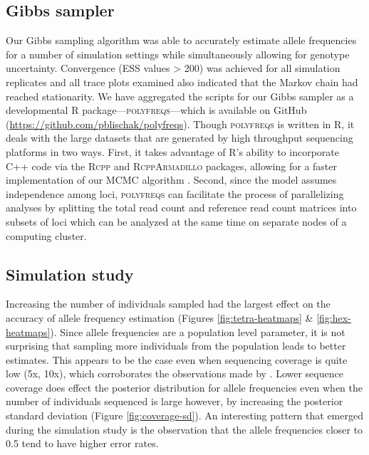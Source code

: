 \documentclass[11pt,english,letterpaper,oneside]{article}
\begin{document}
\subsection*{Gibbs sampler}
\medskip

Our Gibbs sampling algorithm was able to accurately estimate allele frequencies for a number of simulation settings while simultaneously allowing for genotype uncertainty. Convergence (ESS values > 200) was achieved for all simulation replicates and all trace plots examined also indicated that the Markov chain had reached stationarity. We have aggregated the scripts for our Gibbs sampler as a developmental R package---\textsc{polyfreqs}---which is available on GitHub (\url{https://github.com/pblischak/polyfreqs}). Though \textsc{polyfreqs} is written in R, it deals with the large datasets that are generated by high throughput sequencing platforms in two ways. First, it takes advantage of R's ability to incorporate C++ code via the \textsc{Rcpp} and \textsc{RcppArmadillo} packages, allowing for a faster implementation of our MCMC algorithm \citep{eddelbuettel2011rcpp,eddelbuettel2013rcppBook,eddelbuettel2014rcpparmadillo}. Second, since the model assumes independence among loci, \textsc{polyfreqs} can facilitate the process of parallelizing analyses by splitting the total read count and reference read count matrices into subsets of loci which can be analyzed at the same time on separate nodes of a computing cluster.

\medskip
\subsection*{Simulation study}
\medskip

Increasing the number of individuals sampled had the largest effect on the accuracy of allele frequency estimation (Figures \ref{fig:tetra-heatmaps} \& \ref{fig:hex-heatmaps}). Since allele frequencies are a population level parameter, it is not surprising that sampling more individuals from the population leads to better estimates. This appears to be the case even when sequencing coverage is quite low (5x, 10x), which corroborates the observations made by \cite{buerkle2013popModels}. Lower sequence coverage does effect the posterior distribution for allele frequencies even when the number of individuals sequenced is large however, by increasing the posterior standard deviation (Figure \ref{fig:coverage-sd}). An interesting pattern that emerged during the simulation study is the observation that the allele frequencies closer to 0.5 tend to have higher error rates.
\medskip
\end{document}
